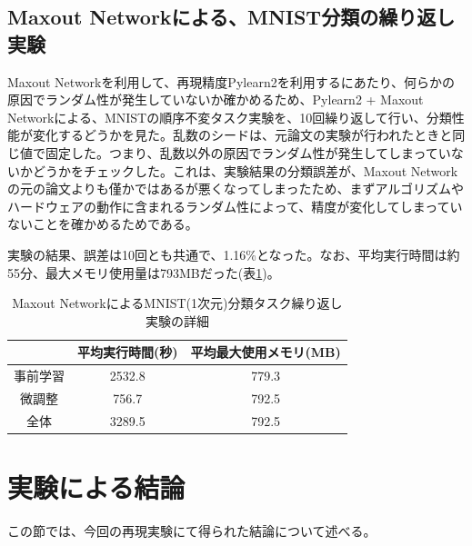 \subsection{Maxout Networkによる、MNIST分類の繰り返し実験}
Maxout Networkを利用して、再現精度Pylearn2を利用するにあたり、何らかの原因でランダム性が発生していないか確かめるため、Pylearn2 + Maxout Networkによる、MNISTの順序不変タスク実験を、10回繰り返して行い、分類性能が変化するどうかを見た。乱数のシードは、元論文の実験が行われたときと同じ値で固定した。つまり、乱数以外の原因でランダム性が発生してしまっていないかどうかをチェックした。これは、実験結果の分類誤差が、Maxout Networkの元の論文よりも僅かではあるが悪くなってしまったため、まずアルゴリズムやハードウェアの動作に含まれるランダム性によって、精度が変化してしまっていないことを確かめるためである。\par
実験の結果、誤差は10回とも共通で、1.16\%となった。なお、平均実行時間は約55分、最大メモリ使用量は793MBだった(表\ref{c5_maxout_mnist1_stat})。\par

\begin{table}[tdp]
\caption{Maxout NetworkによるMNIST(1次元)分類タスク繰り返し実験の詳細}
\begin{center}
\begin{tabular}{|c|c|c|}\hline
 & 平均実行時間(秒) & 平均最大使用メモリ(MB) \\ \hline
事前学習 & 2532.8 & 779.3 \\ \hline
微調整 & 756.7 & 792.5 \\ \hline
全体 & 3289.5 & 792.5 \\ \hline
\end{tabular}
\end{center}
\label{c5_maxout_mnist1_stat}
\end{table}%

\section{実験による結論}
この節では、今回の再現実験にて得られた結論について述べる。
